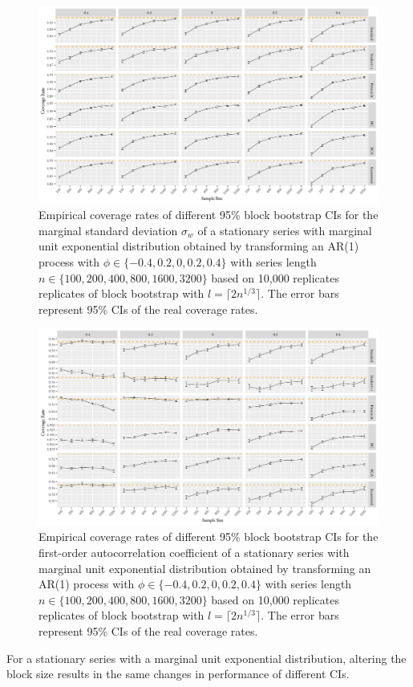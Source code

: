 \documentclass[10pt]{article}
\newcommand{\eds}[1]{\textcolor{red}{EDS: (#1)}}
\newcommand{\mc}[1]{\textcolor{orange}{MC: (#1)}}
\begin{document}
\begin{figure}[tbp]
  \centering
  \includegraphics[width=\textwidth]{figures/plot_exp_sigma_2}
  \caption{Empirical coverage rates of different 95\% block bootstrap CIs for
    the marginal standard deviation $\sigma_w$ %
    of a stationary series with 
    marginal unit exponential distribution obtained by transforming an AR(1) process
    with $\phi \in \{-0.4, 0.2, 0, 0.2, 0.4\}$ with series length 
    $n \in \{100, 200, 400, 800, 1600, 3200\}$ based on 10,000 replicates 
    replicates of
    block bootstrap with $l = \lceil 2n^{1/3} \rceil$. 
    The error bars represent 95\% CIs of the real coverage rates.}
  \label{fig:exp_sigma2}
\end{figure}


\begin{figure}[tbp]
  \centering
  \includegraphics[width=\textwidth]{figures/plot_exp_phi_2}
  \caption{Empirical coverage rates of different 95\% block bootstrap CIs for 
    the first-order autocorrelation coefficient of a stationary series
    with marginal unit exponential distribution obtained by transforming an AR(1) 
    process with 
    $\phi \in \{-0.4, 0.2, 0, 0.2, 0.4\}$ with series length
    $n \in \{100, 200, 400, 800, 1600, 3200\}$ based on 10,000 replicates 
    replicates of
    block bootstrap with $l = \lceil 2n^{1/3} \rceil$. 
    The error bars represent 95\% CIs of the real coverage rates.}
  \label{fig:exp_phi2}
\end{figure}

For a stationary series with a marginal unit exponential distribution, altering 
the 
block size results in the same 
changes in performance of different CIs.
 


\end{document}
